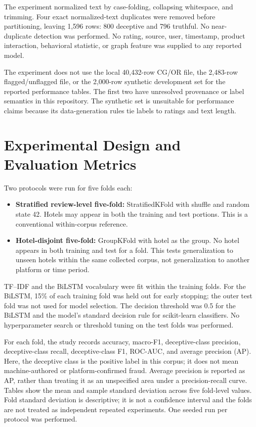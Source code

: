 \documentclass[12pt,a4paper]{report}
\begin{document}
The experiment normalized text by case-folding, collapsing whitespace, and trimming. Four exact normalized-text duplicates were removed before partitioning, leaving 1,596 rows: 800 deceptive and 796 truthful. No near-duplicate detection was performed. No rating, source, user, timestamp, product interaction, behavioral statistic, or graph feature was supplied to any reported model.

The experiment does not use the local 40,432-row CG/OR file, the 2,483-row flagged/unflagged file, or the 2,000-row synthetic development set for the reported performance tables. The first two have unresolved provenance or label semantics in this repository. The synthetic set is unsuitable for performance claims because its data-generation rules tie labels to ratings and text length.

\section{Experimental Design and Evaluation Metrics}

Two protocols were run for five folds each:

\begin{itemize}
    \item \textbf{Stratified review-level five-fold:} StratifiedKFold with shuffle and random state 42. Hotels may appear in both the training and test portions. This is a conventional within-corpus reference.
    \item \textbf{Hotel-disjoint five-fold:} GroupKFold with hotel as the group. No hotel appears in both training and test for a fold. This tests generalization to unseen hotels within the same collected corpus, not generalization to another platform or time period.
\end{itemize}

TF--IDF and the BiLSTM vocabulary were fit within the training folds. For the BiLSTM, 15\% of each training fold was held out for early stopping; the outer test fold was not used for model selection. The decision threshold was 0.5 for the BiLSTM and the model's standard decision rule for scikit-learn classifiers. No hyperparameter search or threshold tuning on the test folds was performed.

For each fold, the study records accuracy, macro-F1, deceptive-class precision, deceptive-class recall, deceptive-class F1, ROC-AUC, and average precision (AP). Here, the deceptive class is the positive label in this corpus; it does not mean machine-authored or platform-confirmed fraud. Average precision is reported as AP, rather than treating it as an unspecified area under a precision-recall curve. Tables show the mean and sample standard deviation across five fold-level values. Fold standard deviation is descriptive; it is not a confidence interval and the folds are not treated as independent repeated experiments. One seeded run per protocol was performed.
\end{document}
